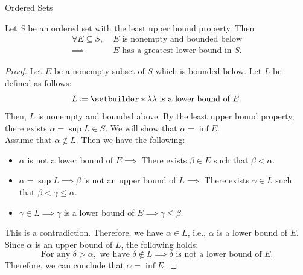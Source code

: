 \begin{section}{Ordered Sets}
\bigskip

\begin{theorem} \label{thm:GreatestLowerBoundProperty}
    Let $S$ be an ordered set with the least upper bound property. Then
    \begin{align*}
        \forall E \subseteq S, \; &E \text{ is nonempty and bounded below} \\
        \implies &E \text{ has a greatest lower bound in } S.
    \end{align*}
\end{theorem}

\begin{proof}
    Let $E$ be a nonempty subset of $S$ which is bounded below. Let $L$ be defined as follows:
    \[
    L \coloneqq \setbuilder*{\lambda}{\lambda \text{ is a lower bound of } E}.
    \]
    Then, $L$ is nonempty and bounded above. By the least upper bound property,
    there exists $\alpha = \sup L \in S$. We will show that $\alpha = \inf E$.
    \\[6mm]
    Assume that $\alpha \notin L$. Then we have the following:
    \begin{itemize}
        \item $\alpha$ is not a lower bound of $E \implies$ There exists $\beta \in E$ such that $\beta < \alpha$.
        \item $\alpha = \sup L \implies \beta$ is not an upper bound of $L \implies$
        There exists $\gamma \in L$ such that $\beta < \gamma \leq \alpha$.
        \item $\gamma \in L \implies \gamma$ is a lower bound of $E \implies \gamma \leq \beta$.
    \end{itemize}
    This is a contradiction. Therefore, we have $\alpha \in L$, i.e., $\alpha$ is a lower bound of $E$.
    Since $\alpha$ is an upper bound of $L$, the following holds:
    \[
    \text{For any } \delta > \alpha, \text{ we have } \delta \notin L
    \implies \delta \text{ is not a lower bound of } E.
    \]
    Therefore, we can conclude that $\alpha = \inf E$. 
\end{proof}

\end{section}
